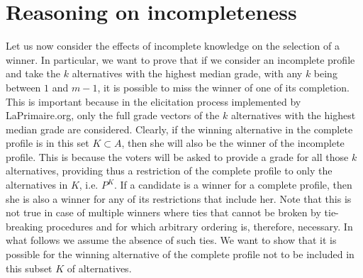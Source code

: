 \section{Reasoning on incompleteness}
Let us now consider the effects of incomplete knowledge on the selection of a winner. In particular, we want to prove that if we consider an incomplete profile and take the $k$ alternatives with the highest median grade, with any $k$ being between $1$ and $m-1$, it is possible to miss the winner of one of its completion. 
This is important because in the elicitation process implemented by LaPrimaire.org, only the full grade vectors of the $k$ alternatives with the highest median grade are considered. Clearly, if the winning alternative in the complete profile is in this set $K \subset A$, then she will also be the winner of the incomplete profile. This is because the voters will be asked to provide a grade for all those $k$ alternatives, providing thus a restriction of the complete profile to only the alternatives in $K$, i.e. $P^K$. If a candidate is a winner for a complete profile, then she is also a winner for any of its restrictions that include her.
Note that this is not true in case of multiple winners where ties that cannot be broken by tie-breaking procedures and for which arbitrary ordering is, therefore, necessary. In what follows we assume the absence of such ties.
We want to show that it is possible for the winning alternative of the complete profile not to be included in this subset $K$ of alternatives.

